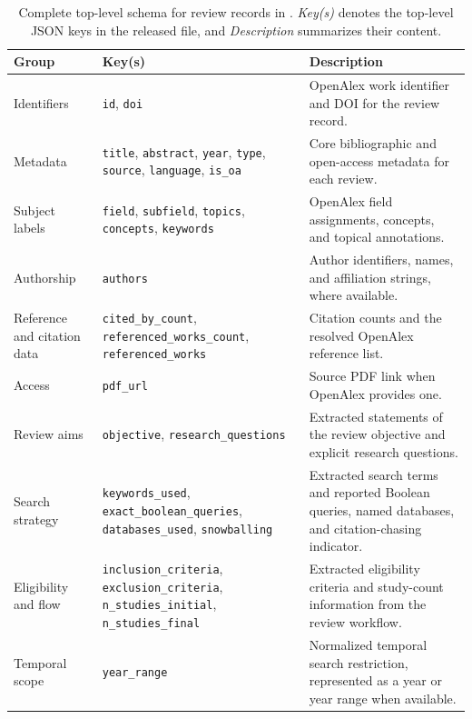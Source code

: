 \begin{table}[t]
\centering
\small
\sffamily
\renewcommand{\arraystretch}{1.15}
\caption{Complete top-level schema for review records in \webisSRCorpus. \textit{Key(s)} denotes the top-level JSON keys in the released file, and \textit{Description} summarizes their content.}
\label{tab:data-record-reviews}

\begin{tabular}{@{}p{1.9cm}p{4.8cm}p{7.7cm}@{}}
\toprule
\textbf{\textsf{Group}} & \textbf{\textsf{Key(s)}} & \textbf{\textsf{Description}} \\
\midrule

Identifiers &
\texttt{id}, \texttt{doi} &
OpenAlex work identifier and DOI for the review record. \\

Metadata &
\texttt{title}, \texttt{abstract}, \texttt{year}, \texttt{type}, \texttt{source}, \texttt{language}, \texttt{is\_oa} &
Core bibliographic and open-access metadata for each review. \\

Subject labels &
\texttt{field}, \texttt{subfield}, \texttt{topics}, \texttt{concepts}, \texttt{keywords} &
OpenAlex field assignments, concepts, and topical annotations. \\

Authorship &
\texttt{authors} &
Author identifiers, names, and affiliation strings, where available. \\

Reference and citation data &
\parbox[t]{4.8cm}{\texttt{cited\_by\_count}, \texttt{referenced\_works\_count}, \texttt{referenced\_works}} &
Citation counts and the resolved OpenAlex reference list. \\

Access &
\texttt{pdf\_url} &
Source PDF link when OpenAlex provides one. \\

Review aims &
\texttt{objective}, \texttt{research\_questions} &
Extracted statements of the review objective and explicit research questions. \\

Search strategy &
\parbox[t]{4.8cm}{\texttt{keywords\_used}, \texttt{exact\_boolean\_queries}, \texttt{databases\_used}, \texttt{snowballing}} &
Extracted search terms and reported Boolean queries, named databases, and citation-chasing indicator. \\

Eligibility and flow &
\parbox[t]{4.8cm}{\texttt{inclusion\_criteria}, \texttt{exclusion\_criteria}, \texttt{n\_studies\_initial}, \texttt{n\_studies\_final}} &
Extracted eligibility criteria and study-count information from the review workflow. \\

Temporal scope &
\texttt{year\_range} &
Normalized temporal search restriction, represented as a year or year range when available. \\

\bottomrule
\end{tabular}

\end{table}

